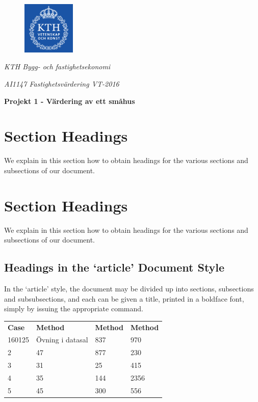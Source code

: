 \documentclass[12pt, a4paper]{article}
\begin{document}
\begin{figure}[t]
  \includegraphics[width=2.51cm]{KTH_Logotyp_RGB_2013}
  \centering
\end{figure}

\centerline{\textit{KTH Bygg- och fastighetsekonomi}}
\centerline{\textit{AI1147 Fastighetsvärdering VT-2016}}



\vspace{1cm}
\centerline{\bfseries\large{Projekt 1 - Värdering av ett småhus}}
\vspace{1cm}


\section*{Section Headings}
We explain in this section how to obtain headings
for the various sections and subsections of our
document.

\lipsum[1-8]

\section*{Section Headings}

We explain in this section how to obtain headings
for the various sections and subsections of our
document.

\subsection*{Headings in the `article' Document Style}

In the `article' style, the document may be divided up
into sections, subsections and subsubsections, and each
can be given a title, printed in a boldface font,
simply by issuing the appropriate command.

\begin{table}[ht]
\begin{tabular}{l l l l}
\bfseries Case & \bfseries Method & \bfseries Method & \bfseries Method \\ 
160125	& Övning i datasal	&	837	& 970 \\
2 & 47 & 877 & 230 \\
3 & 31 & 25  & 415 \\
4 & 35 & 144 & 2356 \\
5 & 45 & 300 & 556 \\ [1ex]
\end{tabular}
\label{table:nonlin}
\end{table}
\end{document}
